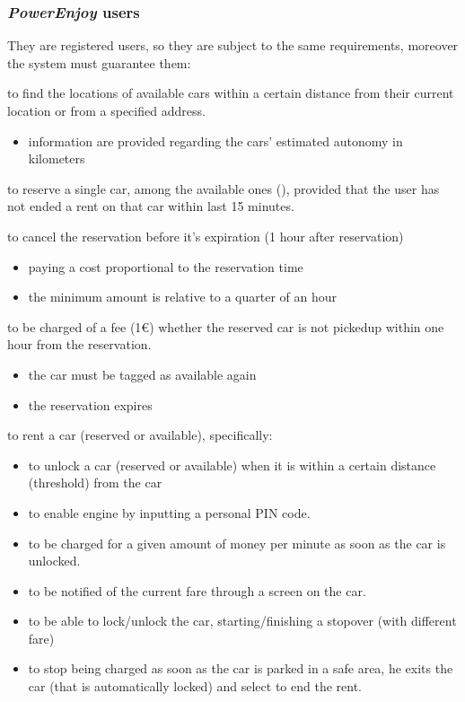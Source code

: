 \documentclass[english]{article}
\newcommand{\powerenjoy}{\textit{PowerEnjoy }}
\newcounter{reqId}
\newenvironment{requirementsgroup}
		{
			\newcommand{\req}[1]{ 
				\stepcounter{reqId} 
				\hypertarget{R\arabic{reqId}}{
					\item[
						 R.\arabic{reqId}
					]{ ##1 }
				}
			}
			\begin{description}
		}
		{
			\end{description}
		}
\begin{document}
	\subsubsection{ \powerenjoy users }
	They are registered users, so they are subject to the same requirements, moreover the system must guarantee them:
	\begin{requirementsgroup}
		 \req { to find the locations of available cars within a certain distance from their current location or from a specified address.
			\begin{itemize}
				\item{information are provided regarding the cars' estimated autonomy in kilometers }
			\end{itemize}
		 }
		 \req { to reserve a single car, among the available ones (), provided that the user has not ended a rent on that car within last 15 minutes. }
		 \req { to cancel the reservation before it's expiration (1 hour after reservation)
			\begin{itemize}
				\item{paying a cost proportional to the reservation time }
				\item{the minimum amount is relative to a quarter of an hour}
			\end{itemize}
		}
		 \req { to be charged of a fee (1\euro) whether the reserved car is not picked\textendash up within one hour from the reservation.
			\begin{itemize}
				\item{the car must be tagged as available again }
				\item{the reservation expires}
			\end{itemize}
		 }

		 \req { to rent a car (reserved or available), specifically:
			\begin{itemize}
				\item { to unlock a car (reserved or available) when it is within a certain distance (threshold) from the car }
				\item { to enable engine by inputting a personal PIN code. }
				\item { to be charged for a given amount of money per minute as soon as the car is unlocked. } 
			 	\item { to be notified of the current fare through a screen on the car. }
			 	\item { to be able to lock/unlock the car, starting/finishing a stopover (with different fare) }
			 	\item { to stop being charged as soon as the car is parked in a safe area, he exits the car (that is automatically locked) and select to end the rent. }
			\end{itemize}
		}
		

\end{requirementsgroup}
\end{document}
